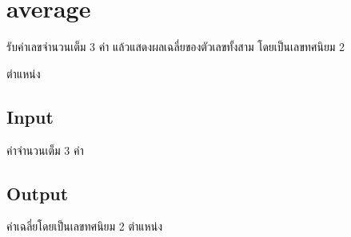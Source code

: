 \documentclass{article}
\begin{document}
\section*{average}

รับค่าเลขจำนวนเต็ม 3 ค่า แล้วแสดงผลเฉลี่ยของตัวเลขทั้งสาม โดยเป็นเลขทศนิยม 2

ตำแหน่ง\\



\subsection*{Input}
ค่าจำนวนเต็ม 3 ค่า



\subsection*{Output}
ค่าเฉลี่ยโดยเป็นเลขทศนิยม 2 ตำแหน่ง
\end{document}

